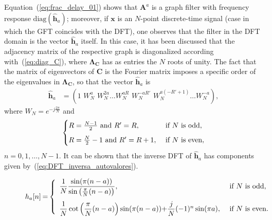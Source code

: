 Equation~(\ref{eq:frac_delay_01}) shows that $ \mathbf{A}^a $ is a graph filter with frequency response $ \mathrm{diag}(\widehat{\mathbf{h}}_a) $; moreover, if $ \mathbf{x} $ is an $N$-point discrete-time signal (case in which the GFT coincides with the DFT), one observes that the filter in the DFT domain is the vector $ \widehat{\mathbf{h}}_a $ itself. In this case, it has been discussed that the adjacency matrix of the respective graph is diagonalized according with~(\ref{eq:diag_C}), where $ \mathbf{\Lambda}_{\mathbf{C}} $ has as entries the $ N $ roots of unity. The fact that the matrix of eigenvectors of $ \mathbf{C} $ is the Fourier matrix imposes a specific order of the eigenvalues in $ \mathbf{\Lambda}_{\mathbf{C}} $, so that the vector $ \widehat{\mathbf{h}}_a$ is
\begin{align*}
    \widehat{\mathbf{h}}_a & = (1 \,\, W_N^a \,\,W_N^{2a}\ldots W_N^{aR} \,\,W_N^{-aR'} \,\,W_N^{a(-R' + 1)}\ldots W_N^{-a}),
\end{align*}
where $ W_N = e^{-j \frac{2\pi}{N}} $ and
\begin{equation}
    \begin{cases}
        R = \frac{N-1}{2} \text{ and } R' = R,     & \text{ if } N \text{ is odd},\vspace{0.2cm} \\
        R = \frac{N}{2} - 1 \text{ and } R' = R+1, & \text{ if } N \text{ is even},
    \end{cases}
\end{equation}
$n=0,1,\ldots,N-1$. It can be shown that the inverse DFT of $ \widehat{\mathbf{h}}_a $ has components given by~(\ref{eq:DFT_inversa_autovalores}).

\begin{figure}%
    \begin{equation}\label{eq:DFT_inversa_autovalores}
        h_a[n]\hspace{-0.03cm}=\hspace{-0.03cm}
        \left\{\begin{array}{ll}
            {\dfrac{1}{N}} \dfrac{\sin (\pi (n-a))}{\sin \left(\frac{\pi}{N} (n-a)\right)},                             & \text{ if $N$ is odd},\vspace{0.25cm} \\
            {\dfrac{1}{N} \cot \left(\dfrac{\pi}{N} (n-a)\right) \sin (\pi (n-a))}{+ \dfrac{j}{N} (-1)^n \sin (\pi a)}, & \text{ if } N \text{ is even}.
        \end{array}\right.
    \end{equation}
\end{figure}

